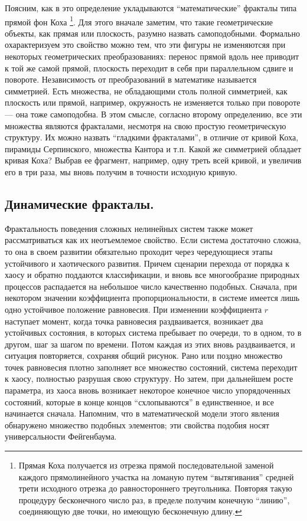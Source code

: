 Поясним, как в это определение укладываются ``математические'' фракталы типа прямой фон Коха \footnote{Прямая Коха получается из отрезка прямой последовательной заменой каждого прямолинейного участка на ломаную путем ``вытягивания'' средней трети исходного отрезка до равностороннего треугольника. Повторяя такую процедуру бесконечного число раз, в пределе получим конечную ``линию'', соединяющую две точки, но имеющую бесконечную длину.}. Для этого вначале заметим, что такие геометрические объекты, как прямая или плоскость, разумно назвать самоподобными. Формально охарактеризуем это свойство можно тем, что эти фигуры не изменяютсяя при некоторых геометрических преобразованиях: перенос прямой вдоль нее приводит к той же самой прямой, плоскость переходит в себя при параллельном сдвиге и повороте. Независимость от преобразований в математике называется симметрией. Есть множества, не обладающими столь полной симметрией, как плоскость или прямой, например, окружность не изменяется только при повороте --- она тоже самоподобна. В этом смысле, согласно второму определению, все эти множества являются фракталами, несмотря на свою простую геометрическую структуру. Их можно назвать ``гладкими фракталами'', в отличие от кривой Коха, пирамиды Серпинского, множества Кантора и т.п. Какой же симметрией обладает кривая Коха? Выбрав ее фрагмент, например, одну треть всей кривой, и увеличив его в три раза, мы вновь получим в точности исходную кривую.
\subsection{Динамические фракталы.}
Фрактальность поведения сложных нелинейных систем также может рассматриваться как их неотъемлемое свойство. Если система достаточно сложна, то она в своем развитии обязательно проходит через чередующиеся этапы устойчивого и хаотического развития. Причем сценарии перехода от порядка к хаосу и обратно поддаются классификации, и вновь все многообразие природных процессов распадается на небольшое число качественно подобных. Сначала, при некотором значении коэффициента пропорциональности, в системе имеется лишь одно устойчивое положение равновесия. При изменении коэффициента $r$ наступает момент, когда точка равновесия раздваивается, возникает два устойчивых состояния, в которых система пребывает по очереди, то в одном, то в другом, шаг за шагом по времени. Потом каждая из этих вновь раздваивается, и ситуация повторяется, сохраняя общий рисунок. Рано или поздно множество точек равновесия плотно заполняет все множество состояний, система переходит к хаосу, полностью разрушая свою структуру. Но затем, при дальнейшем росте параметра, из хаоса вновь возникает некоторое конечное число упорядоченных состояний, которые в конце концов ``схлопываются'' в единственное, и все начинается сначала. Напомним, что в математической модели этого явления обнаружено множество подобных элементов; эти свойства подобия носят универсальности Фейгенбаума.
